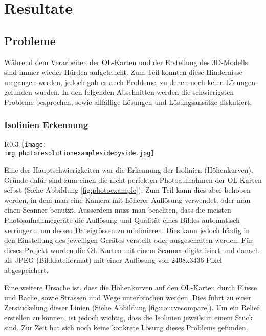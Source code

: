 \section{Resultate}

\subsection{Probleme}

Während dem Verarbeiten der OL-Karten und der Erstellung des 3D-Modells sind immer wieder Hürden aufgetaucht. Zum Teil konnten diese Hindernisse umgangen werden, jedoch gab es auch Probleme, zu denen noch keine Lösungen gefunden wurden. In den folgenden Abschnitten werden die schwierigsten Probleme besprochen, sowie allfällige Lösungen und Lösungsansätze diskutiert.

\subsubsection{Isolinien Erkennung}
\label{subsubsection:isolinien}

\begin{wrapfigure}[17]{R}{0.3\textwidth}
	\centering
	\texttt{[image: \\img photoresolutionexamplesidebyside.jpg]}
	\caption{Photoaufnahme Auflösung Vergleich, oben: 50x50, unten 200x200}
	\label{fig:photoexample}
\end{wrapfigure}

Eine der Hauptschwierigkeiten war die Erkennung der Isolinien (Höhenkurven). Gründe dafür sind zum einen die nicht perfekten Photoaufnahmen der OL-Karten selbst (Siehe Abbildung \ref{fig:photoexample}). Zum Teil kann dies aber behoben werden, in dem man eine Kamera mit höherer Auflösung verwendet, oder man einen Scanner benutzt. Ausserdem muss man beachten, dass die meisten Photoaufnahmegeräte die Auflösung und Qualität eines Bildes automatisch verringern, um dessen Dateigrössen zu minimieren. Dies kann jedoch häufig in den Einstellung des jeweiligen Gerätes verstellt oder ausgeschalten werden. Für dieses Projekt wurden die OL-Karten mit einem Scanner digitalisiert und danach als JPEG (Bilddateiformat) mit einer Auflösung von 2408x3436 Pixel abgespeichert. 



Eine weitere Ursache ist, dass die Höhenkurven auf den OL-Karten durch Flüsse und Bäche, sowie Strassen und Wege unterbrochen werden. Dies führt zu einer Zerstückelung dieser Linien (Siehe Abbildung \ref{fig:courvecompare}). Um ein Relief erstellen zu können, ist jedoch wichtig, dass die Isolinien jeweils in einem Stück sind. Zur Zeit hat sich noch keine konkrete Lösung dieses Problems gefunden. 

